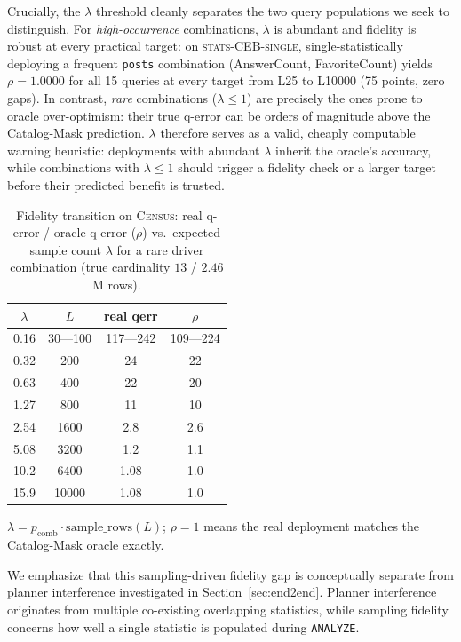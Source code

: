 \documentclass[sigconf, nonacm]{acmart}
\begin{document}
Crucially, the $\lambda$ threshold cleanly separates the two query populations
we seek to distinguish. For \emph{high-occurrence} combinations, $\lambda$ is
abundant and fidelity is robust at every practical target: on
\textsc{stats-CEB-single}, single-statistically deploying a frequent
\texttt{posts} combination (AnswerCount, FavoriteCount) yields $\rho=1.0000$ for
all 15 queries at every target from L25 to L10000 (75 points, zero gaps). In
contrast, \emph{rare} combinations ($\lambda\le1$) are precisely the ones
prone to oracle over-optimism: their true q-error can be orders of magnitude
above the Catalog-Mask prediction. $\lambda$ therefore serves as a valid,
cheaply computable warning heuristic: deployments with abundant $\lambda$ inherit
the oracle's accuracy, while combinations with $\lambda\le1$ should trigger
a fidelity check or a larger target before their predicted benefit is trusted.

\begin{table}[t]
\caption{Fidelity transition on \textsc{Census}: real q-error / oracle q-error
($\rho$) vs.\ expected sample count $\lambda$ for a rare driver combination
(true cardinality $13$ / $2.46$M rows).}
\label{tab:fidelity-lambda}
\small
\begin{tabular}{cccc}
\toprule
$\lambda$ & $L$ & real qerr & $\rho$\\
\midrule
0.16 & 30---100 & 117---242 & 109---224\\
0.32 & 200       & 24          & 22\\
0.63 & 400       & 22          & 20\\
1.27 & 800       & 11          & 10\\
2.54 & 1600      & 2.8         & 2.6\\
5.08 & 3200      & 1.2         & 1.1\\
10.2 & 6400      & 1.08        & 1.0\\
15.9 & 10000     & 1.08        & 1.0\\
\bottomrule
\end{tabular}

{\footnotesize $\lambda=p_{\mathrm{comb}}\cdot\mathrm{sample\_rows}(L)$;
$\rho=1$ means the real deployment matches the Catalog-Mask oracle exactly.}
\end{table}

We emphasize that this sampling-driven fidelity gap is conceptually separate from planner interference investigated in Section~\ref{sec:end2end}.
Planner interference originates from multiple co-existing overlapping statistics, while sampling fidelity concerns how well a single statistic is populated during \texttt{ANALYZE}.
\end{document}

